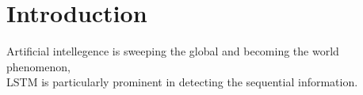 \section{Introduction}
Artificial intellegence is sweeping the global and becoming the world phenomenon, 
\\
LSTM is particularly prominent in detecting the sequential information. 